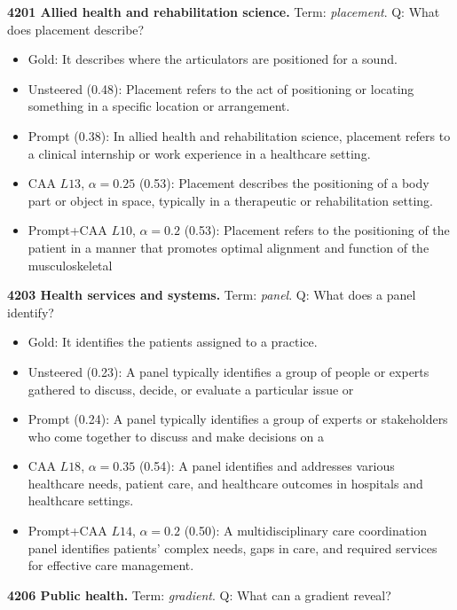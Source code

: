 \medskip\noindent\textbf{4201 Allied health and rehabilitation science.} Term: \emph{placement}.
Q: What does placement describe?
\begin{itemize}\setlength{\itemsep}{0.15em}\setlength{\parsep}{0pt}\setlength{\topsep}{0.2em}
\item Gold: It describes where the articulators are positioned for a sound.
\item Unsteered (0.48): Placement refers to the act of positioning or locating something in a specific location or arrangement.
\item Prompt (0.38): In allied health and rehabilitation science, placement refers to a clinical internship or work experience in a healthcare setting.
\item CAA $L13$, $\alpha=0.25$ (0.53): Placement describes the positioning of a body part or object in space, typically in a therapeutic or rehabilitation setting.
\item Prompt+CAA $L10$, $\alpha=0.2$ (0.53): Placement refers to the positioning of the patient in a manner that promotes optimal alignment and function of the musculoskeletal
\end{itemize}
\medskip\noindent\textbf{4203 Health services and systems.} Term: \emph{panel}.
Q: What does a panel identify?
\begin{itemize}\setlength{\itemsep}{0.15em}\setlength{\parsep}{0pt}\setlength{\topsep}{0.2em}
\item Gold: It identifies the patients assigned to a practice.
\item Unsteered (0.23): A panel typically identifies a group of people or experts gathered to discuss, decide, or evaluate a particular issue or
\item Prompt (0.24): A panel typically identifies a group of experts or stakeholders who come together to discuss and make decisions on a
\item CAA $L18$, $\alpha=0.35$ (0.54): A panel identifies and addresses various healthcare needs, patient care, and healthcare outcomes in hospitals and healthcare settings.
\item Prompt+CAA $L14$, $\alpha=0.2$ (0.50): A multidisciplinary care coordination panel identifies patients' complex needs, gaps in care, and required services for effective care management.
\end{itemize}
\medskip\noindent\textbf{4206 Public health.} Term: \emph{gradient}.
Q: What can a gradient reveal?
